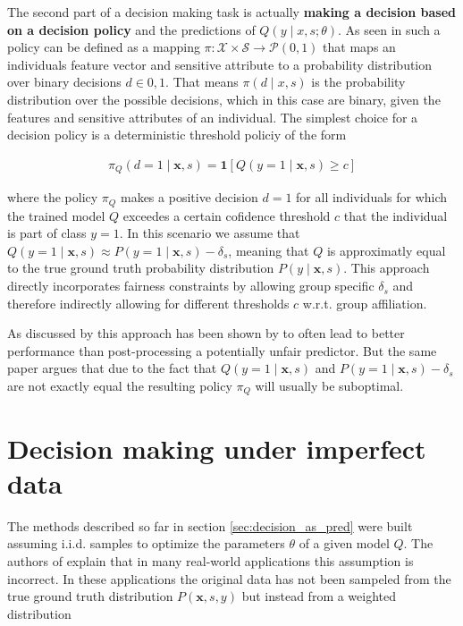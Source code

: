 \documentclass[
	a4paper,
	11pt
	]{article}
\begin{document}
The second part of a decision making task is actually \textbf{making a decision based on a decision policy} and the predictions of $Q(y \mid x, s; \theta)$. As seen in \cite{Kilbertus19} such a policy can be defined as a mapping $\pi: \mathcal{X} \times \mathcal{S} \rightarrow \mathcal{P}({0,1})$ that maps an individuals feature vector and sensitive attribute to a probability distribution over binary decisions $d \in {0, 1}$. That means $\pi(d \mid x, s)$ is the probability distribution over the possible decisions, which in this case are binary, given the features and sensitive attributes of an individual. The simplest choice for a decision policy is a deterministic threshold policiy of the form

\begin{align*}
    \pi_{Q}(d = 1 \mid \boldsymbol{x}, s) = \boldsymbol{1}[Q(y = 1 \mid \boldsymbol{x}, s) \geq c]
\end{align*}

where the policy $\pi_{Q}$ makes a positive decision $d = 1$ for all individuals for which the trained model $Q$ exceedes a certain cofidence threshold $c$ that the individual is part of class $y = 1$. In this scenario we assume that $Q(y = 1 \mid \boldsymbol{x}, s) \approx P(y = 1 \mid \boldsymbol{x}, s) - \delta_s$, meaning that $Q$ is approximatly equal to the true ground truth probability distribution $P(y \mid \boldsymbol{x}, s)$. This approach directly incorporates fairness constraints by allowing group specific $\delta_s$ and therefore indirectly allowing for different thresholds $c$ w.r.t. group affiliation.

As discussed by \cite{Kilbertus19} this approach has been shown by \cite{Woodworth17} to often lead to better performance than post-processing a potentially unfair predictor. But the same paper argues that due to the fact that $Q(y = 1 \mid \boldsymbol{x}, s)$ and $P(y = 1 \mid \boldsymbol{x}, s) - \delta_s$ are not exactly equal the resulting policy $\pi_{Q}$ will usually be suboptimal.

\section{Decision making under imperfect data}
The methods described so far in section \ref{sec:decision_as_pred} were built assuming i.i.d. samples to optimize the parameters $\theta$ of a given model $Q$. The authors of \cite{Kilbertus19} explain that in many real-world applications this assumption is incorrect. In these applications the original data has not been sampeled from the true ground truth distribution $P(\boldsymbol{x}, s, y)$ but instead from a weighted distribution 
\end{document}
